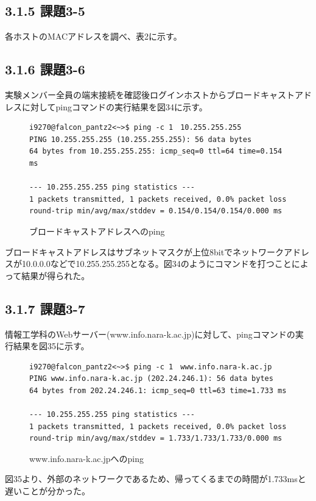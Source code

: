 \documentclass[12pt]{jreport}
\begin{document}
            \subsection*{3.1.5 課題3-5}
                各ホストのMACアドレスを調べ、表2に示す。
            \subsection*{3.1.6 課題3-6}
                実験メンバー全員の端末接続を確認後ログインホストからブロードキャストアドレスに対してpingコマンドの実行結果を図34に示す。
                \begin{figure}[H]
                    \begin{center}
                        \begin{screen}
                            \begin{verbatim}
i9270@falcon_pantz2<~>$ ping -c 1　10.255.255.255
PING 10.255.255.255 (10.255.255.255): 56 data bytes
64 bytes from 10.255.255.255: icmp_seq=0 ttl=64 time=0.154 ms

--- 10.255.255.255 ping statistics ---
1 packets transmitted, 1 packets received, 0.0% packet loss
round-trip min/avg/max/stddev = 0.154/0.154/0.154/0.000 ms
                            \end{verbatim}
                        \end{screen}
                        \caption{ブロードキャストアドレスへのping}
                        \label{34}
                    \end{center}
                \end{figure}
                ブロードキャストアドレスはサブネットマスクが上位8bitでネットワークアドレスが10.0.0.0などで10.255.255.255となる。図34のようにコマンドを打つことによって結果が得られた。
            \subsection*{3.1.7 課題3-7}
                情報工学科のWebサーバー(www.info.nara-k.ac.jp)に対して、pingコマンドの実行結果を図35に示す。
                \begin{figure}[H]
                    \begin{center}
                        \begin{screen}
                            \begin{verbatim}
i9270@falcon_pantz2<~>$ ping -c 1　www.info.nara-k.ac.jp
PING www.info.nara-k.ac.jp (202.24.246.1): 56 data bytes
64 bytes from 202.24.246.1: icmp_seq=0 ttl=63 time=1.733 ms

--- 10.255.255.255 ping statistics ---
1 packets transmitted, 1 packets received, 0.0% packet loss
round-trip min/avg/max/stddev = 1.733/1.733/1.733/0.000 ms
                            \end{verbatim}
                        \end{screen}
                        \caption{www.info.nara-k.ac.jpへのping}
                        \label{34}
                    \end{center}
                \end{figure}
                図35より、外部のネットワークであるため、帰ってくるまでの時間が1.733msと遅いことが分かった。
\end{document}
